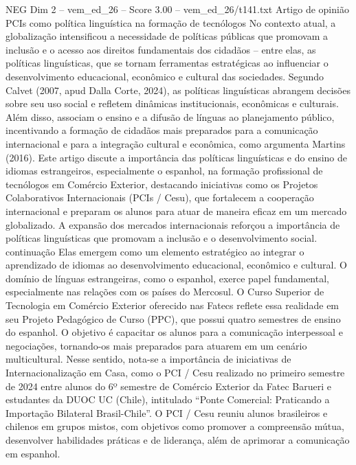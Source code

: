 \begin{textsample}{NEG Dim 2 – vem\_ed\_26 – Score 3.00 – vem\_ed\_26/t141.txt}  \label{ex:f2_neg_164}
Artigo de opinião PCIs como política linguística na formação de tecnólogos No contexto atual, a globalização intensificou a necessidade de políticas públicas que promovam a inclusão e o acesso aos direitos fundamentais dos cidadãos – entre elas, as políticas linguísticas, que se tornam ferramentas estratégicas ao influenciar o desenvolvimento educacional, econômico e cultural das sociedades.
Segundo Calvet (2007, apud Dalla Corte, 2024), as políticas linguísticas abrangem decisões sobre seu uso social e refletem dinâmicas institucionais, econômicas e culturais.
Além disso, associam o ensino e a difusão de línguas ao planejamento público, incentivando a formação de cidadãos mais preparados para a comunicação internacional e para a integração cultural e econômica, como argumenta Martins (2016).
Este artigo discute a importância das políticas linguísticas e do ensino de idiomas estrangeiros, especialmente o espanhol, na formação profissional de tecnólogos em Comércio Exterior, destacando iniciativas como os Projetos Colaborativos Internacionais (PCIs / Cesu), que fortalecem a cooperação internacional e preparam os alunos para atuar de maneira eficaz em um mercado globalizado.
A expansão dos mercados internacionais reforçou a importância de políticas linguísticas que promovam a inclusão e o desenvolvimento social. continuação Elas emergem como um elemento estratégico ao integrar o aprendizado de idiomas ao desenvolvimento educacional, econômico e cultural.
O domínio de línguas estrangeiras, como o espanhol, exerce papel fundamental, especialmente nas relações com os países do Mercosul.
O Curso Superior de Tecnologia em Comércio Exterior oferecido nas Fatecs reflete essa realidade em seu Projeto Pedagógico de Curso (PPC), que possui quatro semestres de ensino do espanhol.
O objetivo é capacitar os alunos para a comunicação interpessoal e negociações, tornando-os mais preparados para atuarem em um cenário multicultural.
Nesse sentido, nota-se a importância de iniciativas de Internacionalização em Casa, como o PCI / Cesu realizado no primeiro semestre de 2024 entre alunos do 6º semestre de Comércio Exterior da Fatec Barueri e estudantes da DUOC UC (Chile), intitulado “Ponte Comercial: Praticando a Importação Bilateral Brasil-Chile”.
O PCI / Cesu reuniu alunos brasileiros e chilenos em grupos mistos, com objetivos como promover a compreensão mútua, desenvolver habilidades práticas e de liderança, além de aprimorar a comunicação em espanhol.

\end{textsample}
